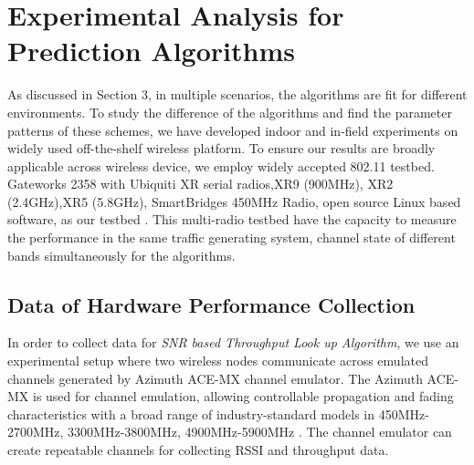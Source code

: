\section{Experimental Analysis for Prediction Algorithms}
\label{sec:experiment design}


As discussed in Section 3, in multiple scenarios, the algorithms are fit for different environments. To study the difference of the algorithms and find the parameter patterns of these schemes, we have developed indoor and in-field experiments 
on widely used off-the-shelf wireless platform.
To ensure our results are broadly applicable across wireless device, we employ widely accepted 802.11 testbed. Gateworks 2358 with Ubiquiti XR serial radios,XR9 (900MHz), XR2 (2.4GHz),XR5 (5.8GHz), SmartBridges 450MHz Radio, open source Linux based software, as our testbed \cite{Gateworks,Ubnt,Openwrt}. 
This multi-radio testbed have the capacity to measure the performance in the same traffic generating system, channel state of different bands simultaneously for the algorithms.


\subsection{Data of Hardware Performance Collection}
\label{subsec:ichannel}
In order to collect data for \emph{SNR based Throughput Look up Algorithm}, we use an experimental setup where two wireless nodes communicate across emulated channels generated by Azimuth ACE-MX channel emulator. 
The Azimuth ACE-MX is used for channel emulation, allowing controllable propagation and fading characteristics with a broad range of industry-standard models in 450MHz-2700MHz, 3300MHz-3800MHz, 4900MHz-5900MHz \cite{AzimuthACE}. 
The channel emulator can create repeatable channels for collecting RSSI and throughput data.

